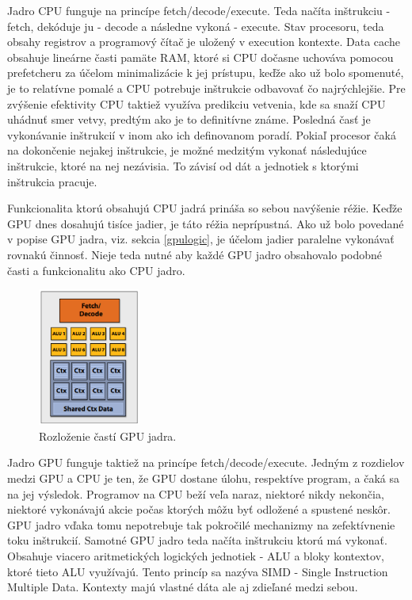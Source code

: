 Jadro CPU funguje na princípe fetch/decode/execute. Teda načíta inštrukciu - fetch, dekóduje ju - decode a následne vykoná - execute. Stav procesoru, teda obsahy registrov a programový čítač je uložený v execution kontexte. Data cache obsahuje lineárne časti pamäte RAM, ktoré si CPU dočasne uchováva pomocou prefetcheru za účelom minimalizácie k jej prístupu, keďže ako už bolo spomenuté, je to relatívne pomalé a CPU potrebuje inštrukcie odbavovať čo najrýchlejšie. Pre zvýšenie efektivity CPU taktiež využíva predikciu vetvenia, kde sa snaží CPU uhádnuť smer vetvy, predtým ako je to definitívne známe. Posledná časť je vykonávanie inštrukcií v inom ako ich definovanom poradí. Pokiaľ procesor čaká na dokončenie nejakej inštrukcie, je možné medzitým vykonať následujúce inštrukcie, ktoré na nej nezávisia. To závisí od dát a jednotiek s ktorými inštrukcia pracuje.

Funkcionalita ktorú obsahujú CPU jadrá prináša so sebou navýšenie réžie. Keďže GPU dnes dosahujú tisíce jadier, je táto réžia neprípustná. Ako už bolo povedané v popise GPU jadra, viz. sekcia \ref{gpulogic}, je účelom jadier paralelne vykonávať rovnakú činnosť. Nieje teda nutné aby každé GPU jadro obsahovalo podobné časti a funkcionalitu ako CPU jadro.

\begin{figure}[H]
	\centering
	\includegraphics[width=0.3\textwidth]{obrazky-figures/gpucore.eps}
	\caption{Rozloženie častí GPU jadra.}
	\label{gpucore}
\end{figure}

Jadro GPU funguje taktiež na princípe fetch/decode/execute. Jedným z rozdielov medzi GPU a CPU je ten, že GPU dostane úlohu, respektíve program, a čaká sa na jej výsledok. Programov na CPU beží veľa naraz, niektoré nikdy nekončia, niektoré vykonávajú akcie počas ktorých môžu byť odložené a spustené neskôr. GPU jadro vďaka tomu nepotrebuje tak pokročilé mechanizmy na zefektívnenie toku inštrukcií. Samotné GPU jadro teda načíta inštrukciu ktorú má vykonať. Obsahuje viacero aritmetických logických jednotiek - ALU a bloky kontextov, ktoré tieto ALU využívajú. Tento princíp sa nazýva SIMD - Single Instruction Multiple Data. Kontexty majú vlastné dáta ale aj zdieľané medzi sebou.

